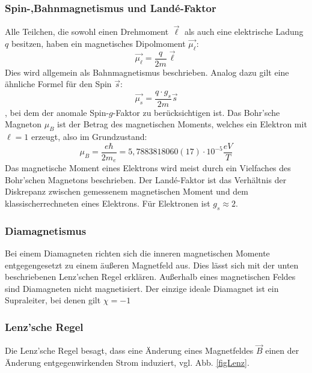         \subsubsection*{Spin-,Bahnmagnetismus und Land\'e-Faktor}
            Alle Teilchen, die sowohl einen Drehmoment $\vec{\ell}$ als auch eine elektrische Ladung $q$ besitzen, haben ein magnetisches Dipolmoment $\vec{\mu_{\ell}}$:
            \begin{equation}
                \vec{\mu_{\ell}} = \frac{q}{2m} \vec{\ell}
            \end{equation}
            Dies wird allgemein als Bahnmagnetismus beschrieben. Analog dazu gilt eine ähnliche Formel für den Spin $\vec{s}$:
            \begin{equation}
                \vec{\mu_s} = \frac{q\cdot g_s}{2m} \vec{s}
            \end{equation},
            bei dem der anomale Spin-$g$-Faktor zu berücksichtigen ist.
            Das Bohr'sche Magneton $\mu_B$ ist der Betrag des magnetischen Moments, welches ein Elektron
            mit $\ell=1$ erzeugt, also im Grundzustand:
            \begin{equation}
                \mu_B = \frac{e \hbar}{2 m_e} = 5,7883818060(17)\cdot 10^{-5} \frac{eV}{T}
            \end{equation}
            Das magnetische Moment eines Elektrons wird meist durch ein Vielfaches des Bohr'schen
            Magnetons beschrieben.
            Der Land\'e-Faktor ist das Verhältnis der Diskrepanz zwischen gemessenem magnetischen Moment
            und dem \dq klassisch\dq errechneten eines Elektrons. Für Elektronen ist $g_s \approx 2$.
        \subsubsection*{Diamagnetismus}
            Bei einem Diamagneten richten sich die inneren magnetischen Momente entgegengesetzt
            zu einem äußeren Magnetfeld aus. Dies lässt sich mit der unten beschriebenen Lenz'schen Regel erklären.
            Außerhalb eines magnetischen Feldes sind Diamagneten
            nicht magnetisiert. Der einzige ideale Diamagnet ist ein Supraleiter, bei denen gilt $\chi = -1$
        \subsubsection*{Lenz'sche Regel}
            Die Lenz'sche Regel besagt, dass eine Änderung eines Magnetfeldes $\vec{B}$ einen der Änderung
            entgegenwirkenden Strom induziert, vgl. Abb. \ref{figLenz}.
            
